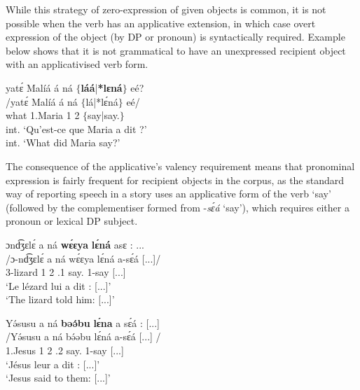 \documentclass[output=paper,colorlinks,citecolor=brown
]{langscibook}
\begin{document}
\z 
\z 

While this strategy of zero-expression of given objects is common, it is not possible when the verb has an applicative extension, in which case overt expression of the object (by DP or pronoun) is syntactically required. Example  below shows that it is not grammatical to have an unexpressed recipient object with an applicativised verb form.

\ea
\label{whatMariasay}
\glll
{\db}yatɛ́	Malíá	á ná	$\{$\textbf{láá}|\textbf{*lɛná}$\}$	eé? \\
/yatɛ́	Malíá	á ná	$\{$lá|*lɛ́ná$\}$	eé/ \\
{\db}what	1.Maria	1\SM{} \PST{}2{} $\{$say|say.\APPL{}$\}$ \Q{} \\
\glt
int. `Qu'est-ce que Maria a dit ?' \\ int. `What did Maria say?' \jambox*{[JO 2448--9] }
\z

The consequence of the applicative's valency requirement means that pronominal expression is fairly frequent for recipient objects in the corpus, as the standard way of reporting speech in a story uses an applicative form of the verb `say' (followed by the complementiser formed from \mbox{-\textit{sɛ́á}} `say'), which requires either a pronoun or lexical DP subject.

\ea
\label{lizardsaid}
\glll
{\db}ɔnd͡ʒɛlɛ́ a ná \textbf{wɛ́ɛya} \textbf{lɛ́ná} asɛ : ... \\
/ɔ-nd͡ʒɛlɛ́ a ná wɛ́ɛya lɛ́ná a-sɛ́á [...]/ \\
{\db}3-lizard 1\SM{} \PST{}2{} \PRO{}.1{} say.\APPL{} 1\SM{}-{}say [...] \\
\glt
`Le lézard lui a dit : [...]' \\ `The lizard told him: [...]' \jambox*{[JO 2068] }
\z

\ea
\glll
{\db}Yə́susu a ná \textbf{bəə́bu} \textbf{lɛ́na} a sɛ́á : [...] \\
/Yə́susu a ná bə́əbu lɛ́ná a-sɛ́á [...] / \\
{\db}1.Jesus 1\SM{} \PST{}2{} \PRO{}.2{} say.\APPL{} 1\SM{}-say [...] \\
\glt
`Jésus leur a dit : [...]' \\ `Jesus said to them: [...]' 
\z
\end{document}

